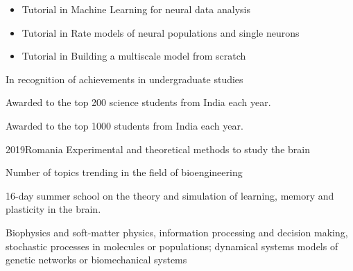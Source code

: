 \documentclass[10pt,a4paper]{altacv}
\begin{document}



\begin{itemize}
\item Tutorial in Machine Learning for neural data analysis 
\item Tutorial in Rate models of neural populations and single neurons
\item Tutorial in Building a multiscale model from scratch
\end{itemize}


In recognition of achievements in undergraduate studies
\divider

Awarded to the top 200 science students from India each year.
\divider

Awarded to the top 1000 students from India each year.



 {2019}{Romania}
Experimental and theoretical methods to study the brain


Number of topics trending in the field of bioengineering

16-day summer school on the theory and simulation of learning, memory and plasticity in the brain.

Biophysics and soft-matter physics, information processing and decision
making, stochastic processes in molecules or populations; dynamical
systems models of genetic networks or biomechanical systems

\end{document}
